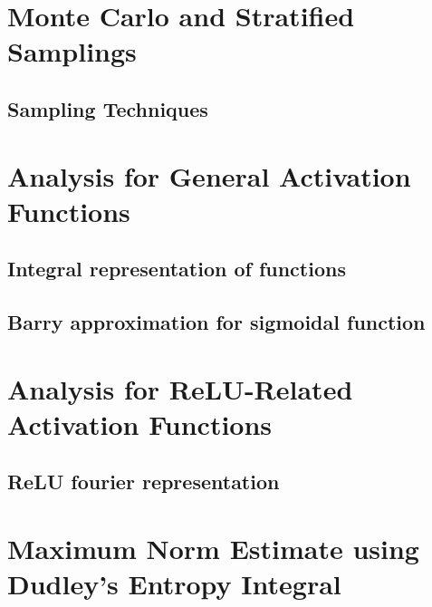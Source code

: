 \documentclass[leqno,labelfig,psfigt]{svmono}
\begin{document}
\chapter{Monte Carlo and Stratified Samplings}
%
\section{Sampling Techniques}



%

\chapter{Analysis for General Activation Functions}
\section{Integral representation of functions}





\section{Barry approximation for sigmoidal function}


\chapter{Analysis for ReLU-Related Activation Functions}
\section{ReLU fourier representation}


 

\chapter{Maximum Norm Estimate using Dudley's Entropy Integral}


%

%
%
%
%
%
%
%
\end{document}
